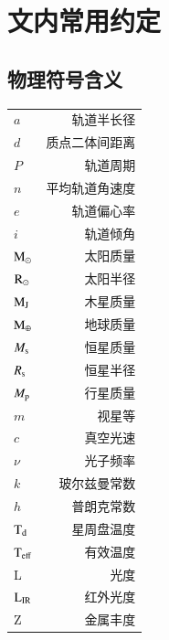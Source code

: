 
\chapter{文内常用约定} \label{apdx:nomenclature}
\section{物理符号含义} \label{apdx:symbol}
\begin{multicols}{2}
\begin{tabularx}{0.85\linewidth}{@{\extracolsep{\fill}}lr}
\centering
$a$      	     			&     轨道半长径 		\\
$d$      	     			&     质点二体间距离	 	\\
$P$      	     			&     轨道周期	 		\\
$n$      	     			&     平均轨道角速度	 	\\
$e$      	     			&     轨道偏心率 		\\
$i$          	     			&     轨道倾角 			\\
$\mathrm{M}_\odot$          		&     太阳质量   			\\
$\mathrm{R}_\odot$          		&     太阳半径   			\\
$\mathrm{M}_\mathrm{J}$          		&     木星质量   			\\
$\mathrm{M}_\oplus$          	&     地球质量   			\\
$M_\mathrm{s}$          		&     恒星质量   			\\
$R_\mathrm{s}$          		&     恒星半径   			\\
$M_\mathrm{p}$         	 	&     行星质量   			\\
$m$         	 			&     视星等   			\\
$c$         	 			&     真空光速   			\\
$\nu$         	 		&     光子频率   			\\
$k$         	 			&     玻尔兹曼常数   		\\
$h$         	 			&     普朗克常数   		\\
$\mathrm{T}_\mathrm{d}$         	 	&     星周盘温度   		\\
$\mathrm{T}_\mathrm{eff}$         	 	&     有效温度 	  		\\
L		         	 	&     光度				\\
$\mathrm{L}_\mathrm{IR}$         	 	&      红外光度   		\\
Z		       	 		&      金属丰度   		
\end{tabularx}
\columnbreak


\end{multicols}
